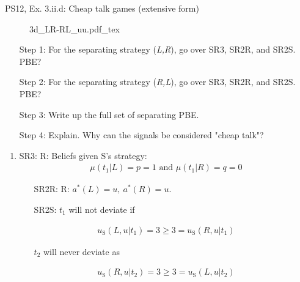 \begin{frame}{PS12, Ex. 3.ii.d: Cheap talk games (extensive form)}
    \begin{multicols}{2}
      \begin{figure}[!h]
        \center{}
        {3d_LR-RL_uu.pdf_tex}
      \end{figure}\vspace{-6pt}
      \begin{itemize}
        \item[Step 1:] For the separating strategy (\textit{L,R}), go over SR3, SR2R, and SR2S. PBE?
        \item[Step 2:] For the separating strategy (\textit{R,L}), go over SR3, SR2R, and SR2S. PBE?
        \item[Step 3:] Write up the full set of separating PBE.
        \item[Step 4:] Explain. Why can the signals be considered "cheap talk"?
      \end{itemize}
      \vfill\null\columnbreak
      \begin{enumerate}
        \item SR3: R: Beliefs given S's strategy:\vspace{-8pt}
        \begin{align*}
          \mu(t_1|L)=p=1\text{ and }\mu(t_1|R)=q=0
        \end{align*}\vspace{-18pt}
        \begin{itemize}\normalsize
          \item[SR2R:] R: $a^*(L)=u,\ a^*(R)=u$.
          \item[SR2S:] $t_1$ will not deviate if
        \end{itemize}\vspace{-10pt}
        \begin{align*}
          u_\text{S}(L,u|t_1)=3\geq 3=u_\text{S}(R,u|t_1)
        \end{align*}\vspace{-18pt}
        \begin{itemize}\normalsize
          \item[] $t_2$ will never deviate as
        \end{itemize}\vspace{-10pt}
        \begin{align*}
          u_\text{S}(R,u|t_2)=3\geq3=u_\text{S}(L,u|t_2)
        \end{align*}\vspace{-18pt}

\end{enumerate}
\end{multicols}
\end{frame}
